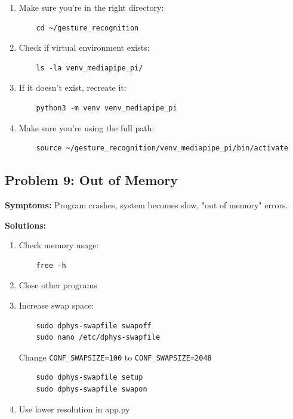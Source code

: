 \documentclass[12pt,a4paper]{article}
\begin{document}
\begin{enumerate}
    \item Make sure you're in the right directory:
    \begin{lstlisting}
    cd ~/gesture_recognition
    \end{lstlisting}
    \item Check if virtual environment exists:
    \begin{lstlisting}
    ls -la venv_mediapipe_pi/
    \end{lstlisting}
    \item If it doesn't exist, recreate it:
    \begin{lstlisting}
    python3 -m venv venv_mediapipe_pi
    \end{lstlisting}
    \item Make sure you're using the full path:
    \begin{lstlisting}
    source ~/gesture_recognition/venv_mediapipe_pi/bin/activate
    \end{lstlisting}
\end{enumerate}

\subsection{Problem 9: Out of Memory}

\textbf{Symptoms:} Program crashes, system becomes slow, "out of memory" errors.

\textbf{Solutions:}

\begin{enumerate}
    \item Check memory usage:
    \begin{lstlisting}
    free -h
    \end{lstlisting}
    \item Close other programs
    \item Increase swap space:
    \begin{lstlisting}
    sudo dphys-swapfile swapoff
    sudo nano /etc/dphys-swapfile
    \end{lstlisting}
    Change \texttt{CONF\_SWAPSIZE=100} to \texttt{CONF\_SWAPSIZE=2048}
    \begin{lstlisting}
    sudo dphys-swapfile setup
    sudo dphys-swapfile swapon
    \end{lstlisting}
    \item Use lower resolution in app.py
\end{enumerate}
\end{document}
